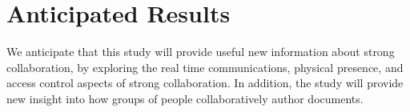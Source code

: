 %
%


%
%
%
%



\section{Anticipated Results}

We anticipate that this study will provide useful new information about
strong collaboration, by exploring the real time communications,
physical presence, and access control aspects of strong
collaboration. In addition, the study will provide new insight into how
groups of people collaboratively author documents.





